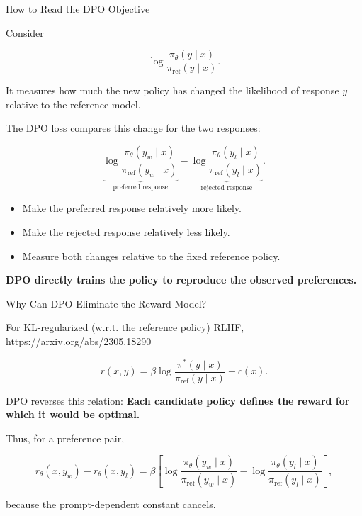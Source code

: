 \documentclass[11pt,compress,t,notes=noshow, xcolor=table]{beamer}
\begin{document}

\begin{vbframe}{How to Read the DPO Objective}

Consider

\[
\log
\frac{\pi_\theta(y\mid x)}
     {\pi_{\mathrm{ref}}(y\mid x)}.
\]

It measures how much the new policy has changed the likelihood
of response $y$ relative to the reference model.

The DPO loss compares this change for the two responses:

\[
\underbrace{
\log
\frac{\pi_\theta(y_w\mid x)}
     {\pi_{\mathrm{ref}}(y_w\mid x)}
}_{\text{preferred response}}
-
\underbrace{
\log
\frac{\pi_\theta(y_l\mid x)}
     {\pi_{\mathrm{ref}}(y_l\mid x)}
}_{\text{rejected response}}.
\]

\begin{itemize}
    \item Make the preferred response relatively more likely.
    \item Make the rejected response relatively less likely.
    \item Measure both changes relative to the fixed reference policy.
\end{itemize}

\begin{center}
\textbf{DPO directly trains the policy to reproduce the observed preferences.}
\end{center}

\end{vbframe}




\begin{vbframe}{Why Can DPO Eliminate the Reward Model?}

For KL-regularized (w.r.t. the reference policy) RLHF, 
{https://arxiv.org/abs/2305.18290}

\[
r(x,y)
=
\beta
\log
\frac{\pi^*(y\mid x)}
     {\pi_{\mathrm{ref}}(y\mid x)}
+
c(x).
\]

DPO reverses this relation: \textbf{Each candidate policy defines the reward
for which it would be optimal.}

Thus, for a preference pair,

\[
r_\theta(x,y_w)-r_\theta(x,y_l)
=
\beta
\left[
\log\frac{\pi_\theta(y_w\mid x)}{\pi_{\mathrm{ref}}(y_w\mid x)}
-
\log\frac{\pi_\theta(y_l\mid x)}{\pi_{\mathrm{ref}}(y_l\mid x)}
\right],
\]

because the prompt-dependent constant cancels.


\end{vbframe}
\end{document}
